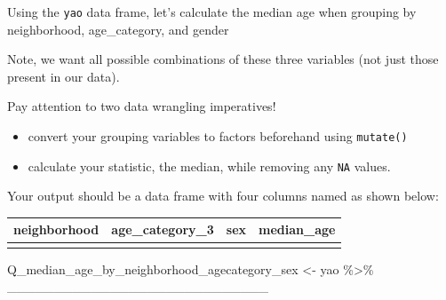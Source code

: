 \documentclass[
  letterpaper,
  DIV=11,
  numbers=noendperiod]{scrreprt}
\newenvironment{Shaded}{\begin{snugshade}}{\end{snugshade}}
\newcommand{\NormalTok}[1]{\textcolor[rgb]{0.00,0.23,0.31}{#1}}
\newcommand{\OtherTok}[1]{\textcolor[rgb]{0.00,0.23,0.31}{#1}}
\newcommand{\SpecialCharTok}[1]{\textcolor[rgb]{0.37,0.37,0.37}{#1}}
\providecommand{\tightlist}{%
  \setlength{\itemsep}{0pt}\setlength{\parskip}{0pt}}\usepackage{longtable,booktabs,array}
\begin{document}
\begin{tcolorbox}[enhanced jigsaw, colframe=quarto-callout-tip-color-frame, rightrule=.15mm, opacityback=0, breakable, coltitle=black, colbacktitle=quarto-callout-tip-color!10!white, bottomrule=.15mm, leftrule=.75mm, toprule=.15mm, arc=.35mm, bottomtitle=1mm, colback=white, left=2mm, opacitybacktitle=0.6, titlerule=0mm, title=\textcolor{quarto-callout-tip-color}{\faLightbulb}\hspace{0.5em}{Practice}, toptitle=1mm]

Using the \texttt{yao} data frame, let's calculate the median age when
grouping by neighborhood, age\_category, and gender

Note, we want all possible combinations of these three variables (not
just those present in our data).

Pay attention to two data wrangling imperatives!

\begin{itemize}
\tightlist
\item
  convert your grouping variables to factors beforehand using
  \texttt{mutate()}
\item
  calculate your statistic, the median, while removing any \texttt{NA}
  values.
\end{itemize}

Your output should be a data frame with four columns named as shown
below:

\begin{longtable}[]{@{}llll@{}}
\toprule\noalign{}
neighborhood & age\_category\_3 & sex & median\_age \\
\midrule\noalign{}
\endhead
\bottomrule\noalign{}
\endlastfoot
& & & \\
\end{longtable}

\begin{Shaded}
\begin{Highlighting}[]
\NormalTok{Q\_median\_age\_by\_neighborhood\_agecategory\_sex }\OtherTok{\textless{}{-}} 
\NormalTok{  yao }\SpecialCharTok{\%\textgreater{}\%}
\NormalTok{  \_\_\_\_\_\_\_\_\_\_\_\_\_\_\_\_\_\_\_\_\_\_\_\_\_\_\_\_}
\end{Highlighting}
\end{Shaded}

\end{tcolorbox}
\end{document}
